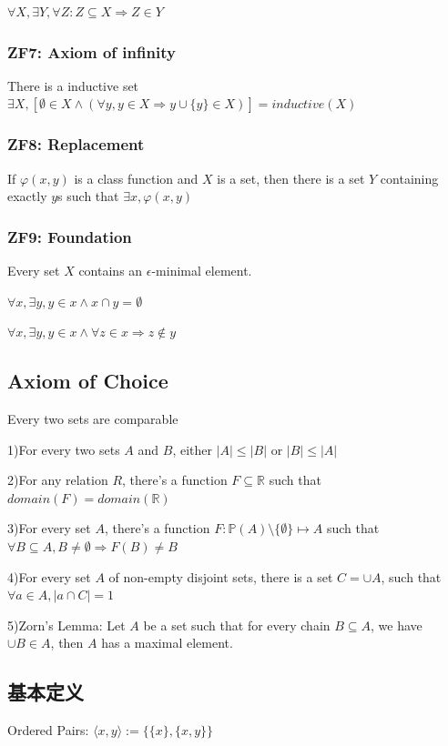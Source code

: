 \documentclass[12pt,a4paper]{ctexrep}
\begin{document}
$\forall X, \exists Y, \forall Z : Z \subseteq X \Rightarrow Z \in Y$

\subsubsection{ZF7: Axiom of infinity}
There is a inductive set $\exists X, [\emptyset \in X \wedge (\forall y, y \in X \Rightarrow y \cup \{y\} \in X)] = inductive(X)$

\subsubsection{ZF8: Replacement}
If $\varphi(x,y)$ is a class function and $X$ is a set, then there is a set $Y$ containing exactly $y$s such that $\exists x, \varphi(x,y)$

\subsubsection{ZF9: Foundation}
Every set $X$ contains an $\epsilon$-minimal element.

$\forall x, \exists y, y \in x \wedge x\cap y = \emptyset$

$\forall x, \exists y, y \in x \wedge \forall z \in x \Rightarrow z \notin y$

\subsection{Axiom of Choice}
Every two sets are comparable

1)For every two sets $A$ and $B$, either $|A| \leqslant |B|$ or $|B|\leqslant|A|$

2)For any relation $R$, there's a function $F \subseteq \mathbb{R}$ such that $domain(F) = domain(\mathbb{R})$

3)For every set $A$, there's a function $F: \mathbb{P}(A) \setminus\{\emptyset\} \mapsto A$ such that $\forall B \subseteq A, B \neq \emptyset \Rightarrow F(B) \neq B$

4)For every set $A$ of non-empty disjoint sets, there is a set $C = \cup A$, such that $\forall a \in A, |a\cap C| = 1$

5)Zorn's Lemma: Let $A$ be a set such that for every chain $B \subseteq A$, we have $\cup B \in A$, then $A$ has a maximal element.
\subsection{基本定义}
Ordered Pairs: $\langle x,y\rangle := \{\{x\},\{x,y\}\}$
\end{document}
